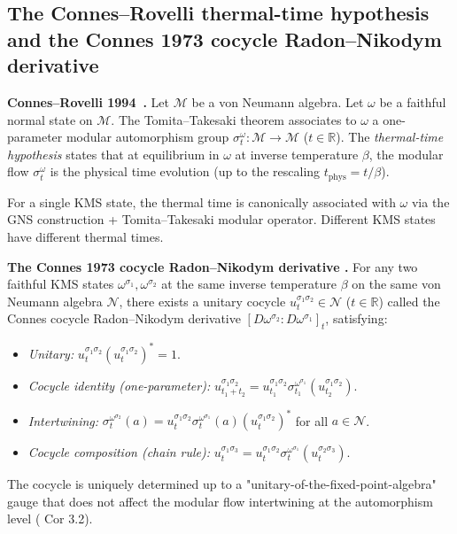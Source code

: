 \documentclass[11pt,a4paper]{article}
\theoremstyle{plain}
\theoremstyle{definition}
\newcommand{\Mcal}{\mathcal{M}}
\newcommand{\Ncal}{\mathcal{N}}
\newcommand{\R}{\mathbb{R}}
\begin{document}
\subsection{The Connes--Rovelli thermal-time hypothesis and the
Connes 1973 cocycle Radon--Nikodym derivative}
\label{sec:connes_rovelli_recap}

\textbf{Connes--Rovelli 1994~\cite{connes_rovelli1994}.} Let $\Mcal$
be a von Neumann algebra. Let $\omega$ be a faithful normal state on
$\Mcal$. The Tomita--Takesaki theorem associates to $\omega$ a
one-parameter modular automorphism group $\sigma_{t}^{\omega}:\Mcal
\to\Mcal$ ($t\in\R$). The \emph{thermal-time hypothesis} states that
at equilibrium in $\omega$ at inverse temperature $\beta$, the
modular flow $\sigma_{t}^{\omega}$ is the physical time evolution
(up to the rescaling $t_{\mathrm{phys}}=t/\beta$).

For a single KMS state, the thermal time is canonically associated
with $\omega$ via the GNS construction + Tomita--Takesaki modular
operator. Different KMS states have different thermal times.

\textbf{The Connes 1973 cocycle Radon--Nikodym derivative
\cite{connes1973}.} For any two faithful KMS states $\omega^{\sigma_{1}},
\omega^{\sigma_{2}}$ at the same inverse temperature $\beta$ on the
same von Neumann algebra $\Ncal$, there exists a unitary cocycle
$u_{t}^{\sigma_{1}\sigma_{2}}\in\Ncal$ ($t\in\R$) called the Connes
cocycle Radon--Nikodym derivative
$[D\omega^{\sigma_{2}}:D\omega^{\sigma_{1}}]_{t}$, satisfying:
\begin{itemize}
\item[(C1)] \emph{Unitary:} $u_{t}^{\sigma_{1}\sigma_{2}}
(u_{t}^{\sigma_{1}\sigma_{2}})^{*}=1$.
\item[(C2)] \emph{Cocycle identity (one-parameter):}
$u_{t_{1}+t_{2}}^{\sigma_{1}\sigma_{2}}=
u_{t_{1}}^{\sigma_{1}\sigma_{2}}\sigma_{t_{1}}^{\omega^{\sigma_{1}}}(u_{t_{2}}^{\sigma_{1}\sigma_{2}})$.
\item[(C3)] \emph{Intertwining:} $\sigma_{t}^{\omega^{\sigma_{2}}}(a)=
u_{t}^{\sigma_{1}\sigma_{2}}\sigma_{t}^{\omega^{\sigma_{1}}}(a)
(u_{t}^{\sigma_{1}\sigma_{2}})^{*}$ for all $a\in\Ncal$.
\item[(C4)] \emph{Cocycle composition (chain rule):}
$u_{t}^{\sigma_{1}\sigma_{3}}=u_{t}^{\sigma_{1}\sigma_{2}}
\sigma_{t}^{\omega^{\sigma_{1}}}(u_{t}^{\sigma_{2}\sigma_{3}})$.
\end{itemize}

The cocycle is uniquely determined up to a "unitary-of-the-fixed-point-algebra"
gauge that does not affect the modular flow intertwining at the
automorphism level (\cite{connes1973} Cor 3.2).
\end{document}
